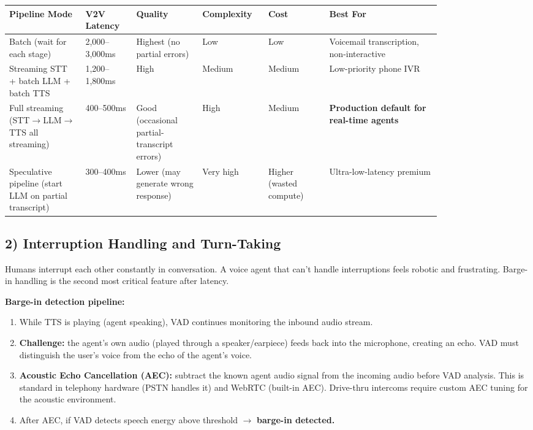 {\small
\begin{tabular}{|p{0.15\linewidth}|p{0.1\linewidth}|p{0.13\linewidth}|p{0.1\linewidth}|p{0.12\linewidth}|p{0.22\linewidth}|}
\hline
\textbf{Pipeline Mode} & \textbf{V2V Latency} & \textbf{Quality} & \textbf{Complexity} & \textbf{Cost} & \textbf{Best For} \\
\hline
Batch (wait for each stage) & 2,000--3,000ms & Highest (no partial errors) & Low & Low & Voicemail transcription, non-interactive \\
\hline
Streaming STT + batch LLM + batch TTS & 1,200--1,800ms & High & Medium & Medium & Low-priority phone IVR \\
\hline
Full streaming (STT$\rightarrow$LLM$\rightarrow$TTS all streaming) & 400--500ms & Good (occasional partial-transcript errors) & High & Medium & \textbf{Production default for real-time agents} \\
\hline
Speculative pipeline (start LLM on partial transcript) & 300--400ms & Lower (may generate wrong response) & Very high & Higher (wasted compute) & Ultra-low-latency premium \\
\hline
\end{tabular}
}

\subsection*{2) Interruption Handling and Turn-Taking}

Humans interrupt each other constantly in conversation. A voice agent that can't handle interruptions feels robotic and frustrating. Barge-in handling is the second most critical feature after latency.

\textbf{Barge-in detection pipeline:}

\begin{enumerate}
  \item While TTS is playing (agent speaking), VAD continues monitoring the inbound audio stream.
  \item \textbf{Challenge:} the agent's own audio (played through a speaker/earpiece) feeds back into the microphone, creating an echo. VAD must distinguish the user's voice from the echo of the agent's voice.
  \item \textbf{Acoustic Echo Cancellation (AEC):} subtract the known agent audio signal from the incoming audio before VAD analysis. This is standard in telephony hardware (PSTN handles it) and WebRTC (built-in AEC). Drive-thru intercoms require custom AEC tuning for the acoustic environment.
  \item After AEC, if VAD detects speech energy above threshold $\rightarrow$ \textbf{barge-in detected.}
\end{enumerate}

